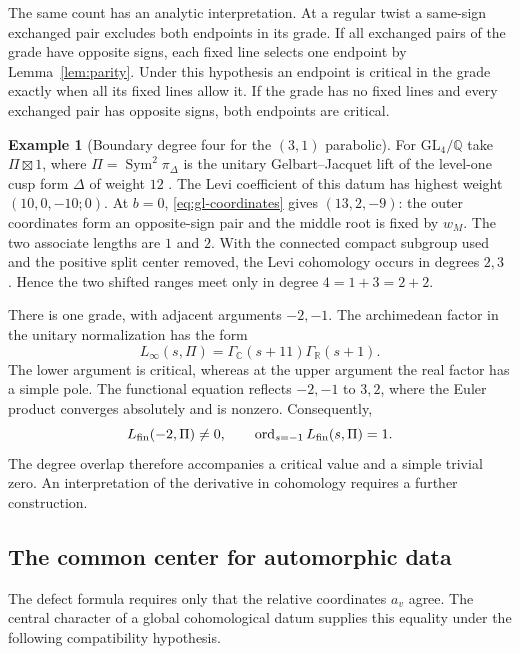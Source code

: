 \documentclass[12pt]{amsart}
\numberwithin{equation}{section}
\theoremstyle{plain}
\theoremstyle{definition}
\newtheorem{example}[theorem]{Example}
\theoremstyle{remark}
\newcommand{\Q}{\mathbb Q}
\newcommand{\C}{\mathbb C}
\newcommand{\R}{\mathbb R}
\newcommand{\GL}{\mathrm{GL}}
\newcommand{\Sym}{\operatorname{Sym}}
\begin{document}
The same count has an analytic interpretation. At a regular twist a same-sign exchanged pair excludes both endpoints in its grade. If all exchanged pairs of the grade have opposite signs, each fixed line selects one endpoint by Lemma~\ref{lem:parity}. Under this hypothesis an endpoint is critical in the grade exactly when all its fixed lines allow it. If the grade has no fixed lines and every exchanged pair has opposite signs, both endpoints are critical.

\begin{example}[Boundary degree four for the $(3,1)$ parabolic] \label{ex:gl4-unbalanced}
For $\GL_4/\Q$ take $\Pi\boxtimes1$, where $\Pi=\Sym^2\pi_\Delta$ is the unitary Gelbart--Jacquet lift of the level-one cusp form $\Delta$ of weight $12$ \cite{GelbartJacquet1978}. The Levi coefficient of this datum has highest weight $(10,0,-10;0)$. At $b=0$, \eqref{eq:gl-coordinates} gives $(13,2,-9)$: the outer coordinates form an opposite-sign pair and the middle root is fixed by $w_M$. The two associate lengths are $1$ and $2$. With the connected compact subgroup used and the positive split center removed, the Levi cohomology occurs in degrees $2,3$ \cite[\S3.1.5, Prop.~3.4]{HarderRaghuram2020}. Hence the two shifted ranges meet only in degree $4=1+3=2+2$.

There is one grade, with adjacent arguments $-2,-1$. The archimedean factor in the unitary normalization has the form \cite[\S2.4, Prop.~2.4 and Rem.~2.5]{LoefflerWilliams}
\[
 L_\infty(s,\Pi)=\Gamma_\C(s+11)\Gamma_\R(s+1).
\]
The lower argument is critical, whereas at the upper argument the real factor has a simple pole. The functional equation reflects $-2,-1$ to $3,2$, where the Euler product converges absolutely and is nonzero. Consequently, 
\[
 L_{\rm fin}(-2,\Pi)\ne0,\qquad
 \operatorname{ord}_{s=-1}L_{\rm fin}(s,\Pi)=1.
\]
The degree overlap therefore accompanies a critical value and a simple trivial zero. An interpretation of the derivative in cohomology requires a further construction. 
\end{example}

\subsection{The common center for automorphic data}

The defect formula requires only that the relative coordinates $a_v$ agree. The central character of a global cohomological datum supplies this equality under the following compatibility hypothesis.
\end{document}
